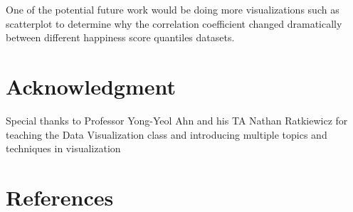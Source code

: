 \documentclass[11pt,twocolumn]{article}
\begin{document}
One of the potential future work would be doing more visualizations such as scatterplot to determine why the correlation coefficient changed dramatically between different happiness score quantiles datasets. 

\section{Acknowledgment}
Special thanks to Professor Yong-Yeol Ahn and his TA Nathan Ratkiewicz for teaching the Data Visualization class and introducing multiple topics and techniques in visualization
\section{References}
 

\end{document}
